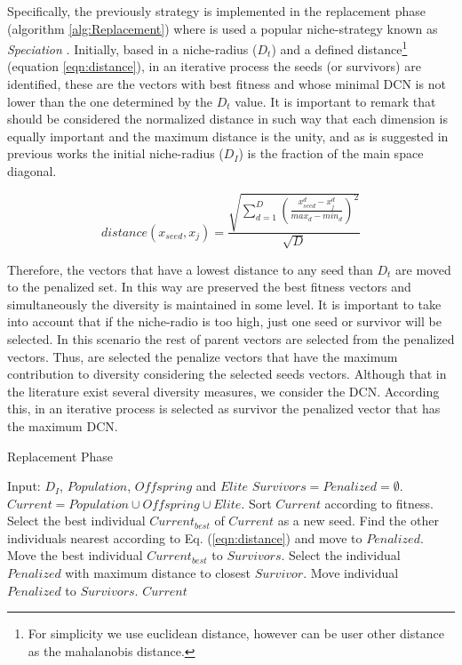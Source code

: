 %
Specifically, the previously strategy is implemented in the replacement phase (algorithm \ref{alg:Replacement}) where is used a popular niche-strategy known as \textit{Speciation} \cite{yang2017multimodal}.
%
Initially, based in a niche-radius ($D_t$) and a defined distance\footnote{For simplicity we use euclidean distance, however can be user other distance as the mahalanobis distance.} (equation \ref{eqn:distance}), in an iterative process the seeds (or survivors) are identified, these are the vectors with best fitness and whose minimal DCN is not lower than the one determined by the $D_t$ value.
%
It is important to remark that should be considered the normalized distance in such way that each dimension is equally important and the maximum distance is the unity, and as is suggested in previous works the initial niche-radius ($D_I$) is the fraction of the main space diagonal.

\begin{equation}\label{eqn:distance}
distance ( x_{seed}, x_j ) = \frac{\sqrt{ \sum_{d=1}^D \left ( \frac{x_{seed}^d - x_j^d}{max_d - min_d} \right )^2  }} {\sqrt{D}}
\end{equation}

%
Therefore, the vectors that have a lowest distance to any seed than $D_t$ are moved to the penalized set.
%
In this way are preserved the best fitness vectors and simultaneously the diversity is maintained in some level.
%
It is important to take into account that if the niche-radio is too high, just one seed or survivor will be selected.
%
In this scenario the rest of parent vectors are selected from the penalized vectors.
%
Thus, are selected the penalize vectors that have the maximum contribution to diversity considering the selected seeds vectors.
%
Although that in the literature exist several diversity measures, we consider the DCN.
%
According this, in an iterative process is selected as survivor the penalized vector that has the maximum DCN.

\begin{algorithm}[H]
  \scriptsize
	\caption{Replacement Phase} \label{alg:Replacement}
	\begin{algorithmic}[1]
	\STATE Input: $D_I$, $Population$, $Offspring$ and $Elite$
	\STATE $Survivors = Penalized = \emptyset$.
	\STATE $Current = Population \cup Offspring \cup Elite$.
	\STATE Sort $Current$ according to fitness.
	   \STATE Select the best individual $Current_{best}$ of $Current$ as a new seed.
	   \STATE Find the other individuals nearest according to Eq. (\ref{eqn:distance}) and move to $Penalized$.
	   \STATE Move the best individual $Current_{best}$ to $Survivors$.
	\ENDWHILE
	   \STATE Select the individual $Penalized$ with maximum distance to closest $Survivor$.
	   \STATE Move individual $Penalized$ to $Survivors$.
	\ENDWHILE
       \RETURN $Current$
\end{algorithmic}
\end{algorithm}

